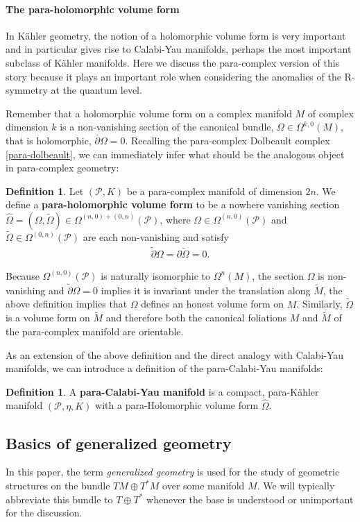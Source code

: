 \documentclass{article}
\newcommand{\TT}{{T\oplus T^*}}
\newcommand{\PS}{\mathcal{P}}
\newcommand{\p}{\partial}
\newcommand{\pt}{\tilde{\partial}}
\newcommand{\Mt}{\tl{M}}
\def\tl{\tilde}
\theoremstyle{definition}
\newtheorem{Def}[theorem]{Definition}
\theoremstyle{remark}
\begin{document}
\paragraph{The para-holomorphic volume form}
In K\"ahler geometry, the notion of a holomorphic volume form is very important and in particular gives rise to Calabi-Yau manifolds, perhaps the most important subclass of K\"ahler manifolds. Here we discuss the para-complex version of this story because it plays an important role when considering the anomalies of the R-symmetry at the quantum level.

Remember that a holomorphic volume form on a complex manifold $M$ of complex dimension $k$ is a non-vanishing section of the canonical bundle, $\Omega \in \Omega^{k,0}(M)$, that is holomorphic, $\bar{\p}\Omega=0$. Recalling the para-complex Dolbeault complex \eqref{para-dolbeault}, we can immediately infer what should be the analogous object in para-complex geometry:
\begin{Def}
Let $(\PS,K)$ be a para-complex manifold of dimension $2n$. We define a {\bf para-holomorphic volume form} to be a nowhere vanishing section $\hat{\Omega}=(\Omega,\tl{\Omega})\in \Omega^{(n,0)+(0,n)}(\PS)$, where $\Omega \in \Omega^{(n,0)}(\PS)$ and $\tl{\Omega}\in \Omega^{(0,n)}(\PS)$ are each non-vanishing and satisfy
\begin{align*}
\pt \Omega=\p \tl{\Omega}=0.
\end{align*}
\end{Def}
Because $\Omega^{(n,0)}(\PS)$ is naturally isomorphic to $\Omega^n(M)$, the section $\Omega$ is non-vanishing and $\pt \Omega=0$ implies it is invariant under the translation along $\Mt$, the above definition implies that $\Omega$ defines an honest volume form on $M$. Similarly, $\tl{\Omega}$ is a volume form on $\Mt$ and therefore both the canonical foliations $M$ and $\Mt$ of the para-complex manifold are orientable.

As an extension of the above definition and the direct analogy with Calabi-Yau manifolds, we can introduce a definition of the para-Calabi-Yau manifolds:
\begin{Def}
A {\bf para-Calabi-Yau manifold} is a compact, para-K\"ahler manifold $(\PS,\eta,K)$ with a para-Holomorphic volume form $\hat{\Omega}$.
\end{Def}

\subsection{Basics of generalized geometry}
In this paper, the term {\it generalized geometry} is used for the study of geometric structures on the bundle $TM \oplus T^*M$ over some manifold $M$. We will typically abbreviate this bundle to $\TT$ whenever the base is understood or unimportant for the discussion.
\end{document}
